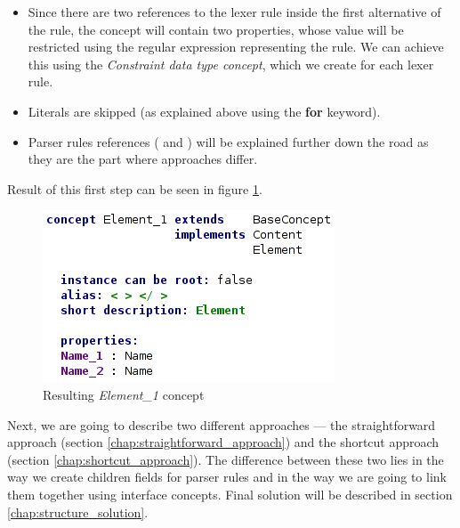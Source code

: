 \begin{itemize}
	\item Since there are two references to the  lexer rule inside the first alternative of the  rule, the  concept will contain two properties, whose value will be restricted using the regular expression representing the  rule.
	We can achieve this using the \textit{Constraint data type concept}, which we create for each lexer rule.

	\item Literals are skipped (as explained above using the \textbf{for} keyword).

	\item Parser rules references ( and ) will be explained further down the road as they are the part where approaches differ.
\end{itemize}

Result of this first step can be seen in figure \ref{fig:element_concept_common}.

\begin{figure}[h]
	\centering
	\includegraphics[scale=0.7]{./img/element_concept_common.png}
	\caption{Resulting \textit{Element{\_}1} concept}
	\label{fig:element_concept_common}
\end{figure}

Next, we are going to describe two different approaches --- the straightforward approach (section \ref{chap:straightforward_approach}) and the shortcut approach (section \ref{chap:shortcut_approach}).
The difference between these two lies in the way we create children fields for parser rules and in the way we are going to link them together using interface concepts.
Final solution will be described in section \ref{chap:structure_solution}.

\pagebreak



